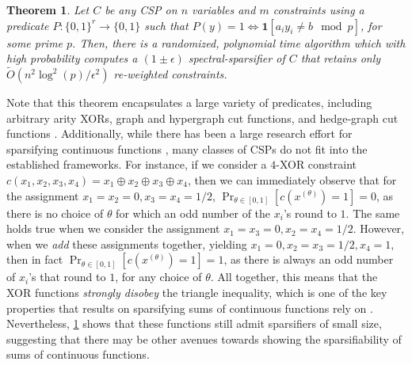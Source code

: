 \documentclass[11pt]{article}
\newtheorem{theorem}{Theorem}[section]
\theoremstyle{definition}
\newcommand{\zo}{\{0, 1\}}
\newcommand{\eps}{\epsilon}
\begin{document}
\begin{theorem}\label{thm:generalCSPintro}
	Let $C$ be any CSP on $n$ variables and $m$ constraints using a predicate $P: \zo^r \rightarrow \zo$ such that $P(y) = 1 \iff \mathbf{1}[a_i y_i \neq b \mod p]$, for some prime $p$. Then, there is a randomized, polynomial time algorithm which with high probability computes a $(1 \pm \eps)$ spectral-sparsifier of $C$ that retains only $\widetilde{O}(n^2 \log^2(p) / \eps^2)$ re-weighted constraints.
\end{theorem}

Note that this theorem encapsulates a large variety of predicates, including arbitrary arity XORs, graph and hypergraph cut functions, and hedge-graph cut functions \cite{KPS24}. Additionally, while there has been a large research effort for sparsifying continuous functions \cite{JLLS23, JLLS24}, many classes of CSPs do not fit into the established frameworks. For instance, if we consider a $4$-XOR constraint $c(x_1, x_2, x_3, x_4) = x_1 \oplus x_2 \oplus x_3 \oplus x_4$, then we can immediately observe that for the assignment $x_1 = x_2 = 0, x_3 = x_4 = 1/2$, $\Pr_{\theta \in [0,1]}[c(x^{(\theta)}) = 1] = 0$, as there is no choice of $\theta$ for which an odd number of the $x_i$'s round to $1$. The same holds true when we consider the assignment $x_1 = x_3 = 0, x_2 = x_4 = 1/2$. However, when we \emph{add} these assignments together, yielding $x_1 = 0, x_2 = x_3 = 1/2, x_4 = 1$, then in fact $\Pr_{\theta \in [0,1]}[c(x^{(\theta)}) = 1] = 1$, as there is always an odd number of $x_i$'s that round to $1$, for any choice of $\theta$. All together, this means that the XOR functions \emph{strongly disobey} the triangle inequality, which is one of the key properties that results on sparsifying sums of continuous functions rely on \cite{JLLS23, JLLS24}. Nevertheless, \cref{thm:generalCSPintro} shows that these functions still admit sparsifiers of small size, suggesting that there may be other avenues towards showing the sparsifiability of sums of continuous functions.
\end{document}
